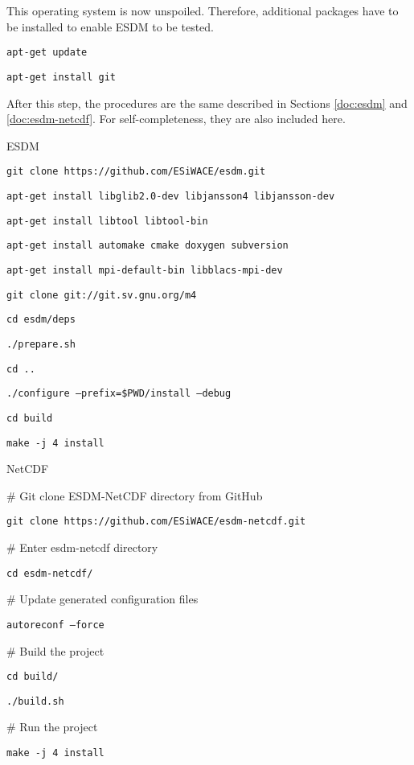 This operating system is now unspoiled. Therefore, additional packages have to be installed to enable ESDM to be tested.

\begin{framed}

\texttt{apt-get update}

\texttt{apt-get install git}

\end{framed}

After this step, the procedures are the same described in Sections \ref{doc:esdm} and \ref{doc:esdm-netcdf}. For self-completeness, they are also included here.

\begin{framed}

ESDM

\texttt{git clone https://github.com/ESiWACE/esdm.git}

\texttt{apt-get install libglib2.0-dev libjansson4 libjansson-dev}

\texttt{apt-get install libtool libtool-bin}

\texttt{apt-get install automake cmake doxygen subversion}

\texttt{apt-get install mpi-default-bin libblacs-mpi-dev}

\texttt{git clone git://git.sv.gnu.org/m4}

\texttt{cd esdm/deps}

\texttt{./prepare.sh}

\texttt{cd ..}

\texttt{./configure --prefix=\$PWD/install --debug}

\texttt{cd build}

\texttt{make -j 4 install}

\end{framed}

\begin{framed}

NetCDF

\# Git clone ESDM-NetCDF directory from GitHub

\texttt{git clone https://github.com/ESiWACE/esdm-netcdf.git}

\# Enter esdm-netcdf directory

\texttt{cd esdm-netcdf/}

\# Update generated configuration files

\texttt{autoreconf --force}

\# Build the project

\texttt{cd build/}

\texttt{./build.sh}

\# Run the project

\texttt{make -j 4 install}

\end{framed}

